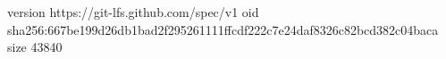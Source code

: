 version https://git-lfs.github.com/spec/v1
oid sha256:667be199d26db1bad2f295261111ffcdf222c7e24daf8326c82bcd382c04baca
size 43840
